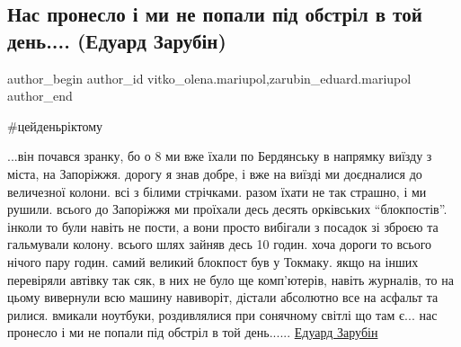  
 
 
 
 

\subsection{Нас пронесло і ми не попали під обстріл в той день.... (Едуард Зарубін)}
\label{sec:16_03_2023.fb.vitko_olena.mariupol.1.nas_proneslo___mi_ne}
 
\ifcmt
 author_begin
   author_id vitko_olena.mariupol,zarubin_eduard.mariupol
 author_end
\fi

\#цейденьріктому

...він почався зранку, бо о 8 ми вже їхали по Бердянську в напрямку виїзду з
міста, на Запоріжжя. дорогу я знав добре, і вже на виїзді ми доєдналися до
величезної колони. всі з білими стрічками. разом їхати не так страшно, і ми
рушили. всього до Запоріжжя ми проїхали десь десять орківських \enquote{блокпостів}.
інколи то були навіть не пости, а вони просто вибігали з посадок зі зброєю та
гальмували колону. всього шлях зайняв десь 10 годин. хоча дороги то всього
нічого пару годин. самий великий блокпост був у Токмаку. якщо на інших
перевіряли автівку так сяк, в них не було ще комп'ютерів, навіть журналів, то
на цьому вивернули всю машину навиворіт, дістали абсолютно все на асфальт та
рилися. вмикали ноутбуки, роздивлялися при сонячному світлі що там є... нас
пронесло і ми не попали під обстріл в той день...... \href{https://www.facebook.com/edwazar}{Едуард Зарубін}
